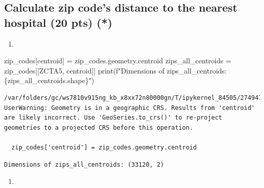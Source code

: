 \documentclass[
  letterpaper,
  DIV=11,
  numbers=noendperiod]{scrartcl}
\newenvironment{Shaded}{\begin{snugshade}}{\end{snugshade}}
\newcommand{\BuiltInTok}[1]{\textcolor[rgb]{0.00,0.23,0.31}{#1}}
\newcommand{\NormalTok}[1]{\textcolor[rgb]{0.00,0.23,0.31}{#1}}
\newcommand{\OperatorTok}[1]{\textcolor[rgb]{0.37,0.37,0.37}{#1}}
\newcommand{\SpecialCharTok}[1]{\textcolor[rgb]{0.37,0.37,0.37}{#1}}
\newcommand{\SpecialStringTok}[1]{\textcolor[rgb]{0.13,0.47,0.30}{#1}}
\newcommand{\StringTok}[1]{\textcolor[rgb]{0.13,0.47,0.30}{#1}}
\providecommand{\tightlist}{%
  \setlength{\itemsep}{0pt}\setlength{\parskip}{0pt}}\usepackage{longtable,booktabs,array}
\begin{document}
\subsection{Calculate zip code's distance to the nearest hospital (20
pts)
(*)}\label{calculate-zip-codes-distance-to-the-nearest-hospital-20-pts}

\begin{enumerate}
\def\labelenumi{\arabic{enumi}.}
\tightlist
\item
\end{enumerate}

\begin{Shaded}
\begin{Highlighting}[]
\NormalTok{zip\_codes[}\StringTok{\textquotesingle{}centroid\textquotesingle{}}\NormalTok{] }\OperatorTok{=}\NormalTok{ zip\_codes.geometry.centroid}
\NormalTok{zips\_all\_centroids }\OperatorTok{=}\NormalTok{ zip\_codes[[}\StringTok{\textquotesingle{}ZCTA5\textquotesingle{}}\NormalTok{, }\StringTok{\textquotesingle{}centroid\textquotesingle{}}\NormalTok{]]}
\BuiltInTok{print}\NormalTok{(}\SpecialStringTok{f"Dimensions of zips\_all\_centroids: }\SpecialCharTok{\{}\NormalTok{zips\_all\_centroids}\SpecialCharTok{.}\NormalTok{shape}\SpecialCharTok{\}}\SpecialStringTok{"}\NormalTok{)}
\end{Highlighting}
\end{Shaded}

\begin{verbatim}
/var/folders/gc/ws7810v915ng_kb_x8xx72n80000gn/T/ipykernel_84505/2749478377.py:1: UserWarning: Geometry is in a geographic CRS. Results from 'centroid' are likely incorrect. Use 'GeoSeries.to_crs()' to re-project geometries to a projected CRS before this operation.

  zip_codes['centroid'] = zip_codes.geometry.centroid
\end{verbatim}

\begin{verbatim}
Dimensions of zips_all_centroids: (33120, 2)
\end{verbatim}

\begin{enumerate}
\def\labelenumi{\arabic{enumi}.}
\setcounter{enumi}{1}
\tightlist
\item
\end{enumerate}
\end{document}
